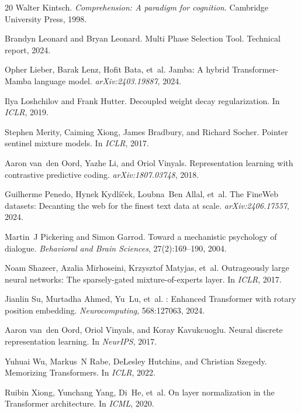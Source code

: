 \documentclass{article}
\begin{document}
\begin{thebibliography}{20}
Walter Kintsch.
\newblock \emph{Comprehension: A paradigm for cognition}.
\newblock Cambridge University Press, 1998.

Brandyn Leonard and Bryan Leonard.
\newblock Multi Phase Selection Tool.
\newblock Technical report, 2024.

Opher Lieber, Barak Lenz, Hofit Bata, et~al.
\newblock Jamba: A hybrid {Transformer-Mamba} language model.
\newblock \emph{arXiv:2403.19887}, 2024.

Ilya Loshchilov and Frank Hutter.
\newblock Decoupled weight decay regularization.
\newblock In \emph{ICLR}, 2019.

Stephen Merity, Caiming Xiong, James Bradbury, and Richard Socher.
\newblock Pointer sentinel mixture models.
\newblock In \emph{ICLR}, 2017.

Aaron van~den Oord, Yazhe Li, and Oriol Vinyals.
\newblock Representation learning with contrastive predictive coding.
\newblock \emph{arXiv:1807.03748}, 2018.

Guilherme Penedo, Hynek Kydl\'{i}\v{c}ek, Loubna~Ben Allal, et~al.
\newblock The FineWeb datasets: Decanting the web for the finest text data at
  scale.
\newblock \emph{arXiv:2406.17557}, 2024.

Martin~J Pickering and Simon Garrod.
\newblock Toward a mechanistic psychology of dialogue.
\newblock \emph{Behavioral and Brain Sciences}, 27(2):169--190, 2004.

Noam Shazeer, Azalia Mirhoseini, Krzysztof Matyjas, et~al.
\newblock Outrageously large neural networks: The sparsely-gated
  mixture-of-experts layer.
\newblock In \emph{ICLR}, 2017.

Jianlin Su, Murtadha Ahmed, Yu~Lu, et~al.
: Enhanced {Transformer} with rotary position embedding.
\newblock \emph{Neurocomputing}, 568:127063, 2024.

Aaron van~den Oord, Oriol Vinyals, and Koray Kavukcuoglu.
\newblock Neural discrete representation learning.
\newblock In \emph{NeurIPS}, 2017.

Yuhuai Wu, Markus~N Rabe, DeLesley Hutchins, and Christian Szegedy.
\newblock Memorizing Transformers.
\newblock In \emph{ICLR}, 2022.

Ruibin Xiong, Yunchang Yang, Di~He, et~al.
\newblock On layer normalization in the {Transformer} architecture.
\newblock In \emph{ICML}, 2020.

\end{thebibliography}
\end{document}
